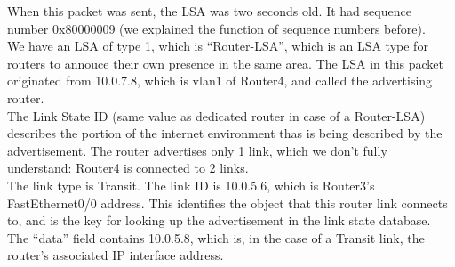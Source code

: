 When this packet was sent, the LSA was two seconds old. It had sequence number 0x80000009 (we explained the function of sequence numbers before). \\
We have an LSA of type 1, which is ``Router-LSA'', which is an LSA type for routers to annouce their own presence in the
same area. The LSA in this packet originated from 10.0.7.8, which is vlan1 of Router4, and called the advertising router. \\
The Link State ID (same value as dedicated router in case of a Router-LSA) describes the portion of the internet environment
thas is being described by the advertisement. The router advertises only 1 link, which we don't fully understand:
Router4 is connected to 2 links. \\
The link type is Transit. The link ID is 10.0.5.6, which is Router3's FastEthernet0/0 address.
This identifies the object that this router link connects to, and is the key for looking up the advertisement in the link state database.
The ``data'' field contains 10.0.5.8, which is, in the case of a Transit link, the router's associated IP interface address.
